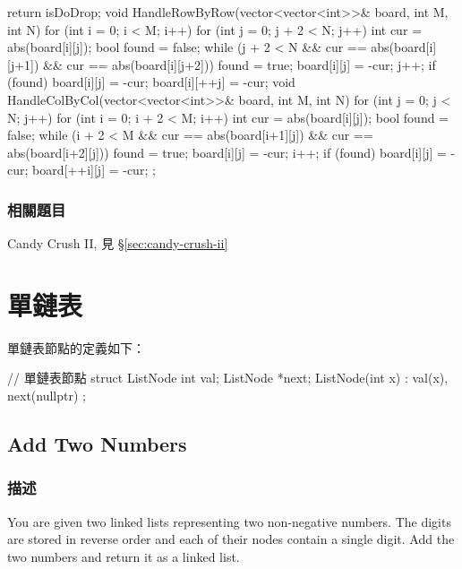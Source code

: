 \begin{Code}
{{        return isDoDrop;
    }
    void HandleRowByRow(vector<vector<int>>& board, int M, int N)
    {
        for (int i = 0; i < M; i++)
        {
            for (int j = 0; j + 2 < N; j++)
            {
                int cur = abs(board[i][j]);
                bool found = false;
                while (j + 2 < N && cur == abs(board[i][j+1]) && cur == abs(board[i][j+2]))
                {
                    found = true;
                    board[i][j] = -cur;
                    j++;
                }
                if (found)
                {
                    board[i][j] = -cur;
                    board[i][++j] = -cur;
                }
            }
        }
    }
    void HandleColByCol(vector<vector<int>>& board, int M, int N)
    {
        for (int j = 0; j < N; j++)
        {
            for (int i = 0; i + 2 < M; i++)
            {
                int cur = abs(board[i][j]);
                bool found = false;
                while (i + 2 < M && cur == abs(board[i+1][j]) && cur == abs(board[i+2][j]))
                {
                    found = true;
                    board[i][j] = -cur;
                    i++;
                }
                if (found)
                {
                    board[i][j] = -cur;
                    board[++i][j] = -cur;
                }
            }
        }
    }
};
\end{Code}

\subsubsection{相關題目}
\begindot
\item Candy Crush II, 見 \S \ref{sec:candy-crush-ii}
\myenddot

\section{單鏈表} %

單鏈表節點的定義如下：
\begin{Code}
// 單鏈表節點
struct ListNode {
    int val;
    ListNode *next;
    ListNode(int x) : val(x), next(nullptr) { }
};
\end{Code}


\subsection{Add Two Numbers}
\label{sec:add-two-numbers}


\subsubsection{描述}
You are given two linked lists representing two non-negative numbers. The digits are stored in reverse order and each of their nodes contain a single digit. Add the two numbers and return it as a linked list.

